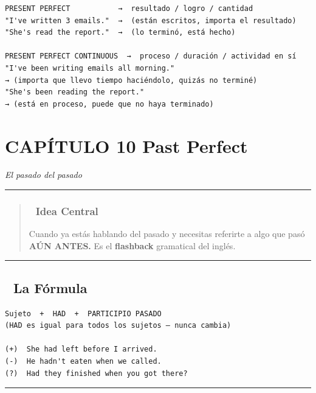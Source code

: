 \documentclass[
  spanish,
  letterpaper,
]{scrbook}
\begin{document}
\begin{verbatim}
PRESENT PERFECT           →  resultado / logro / cantidad
"I've written 3 emails."  →  (están escritos, importa el resultado)
"She's read the report."  →  (lo terminó, está hecho)

PRESENT PERFECT CONTINUOUS  →  proceso / duración / actividad en sí
"I've been writing emails all morning."
→ (importa que llevo tiempo haciéndolo, quizás no terminé)
"She's been reading the report."
→ (está en proceso, puede que no haya terminado)
\end{verbatim}

\chapter{CAPÍTULO 10 Past Perfect}\label{capuxedtulo-10-past-perfect}

\emph{El pasado del pasado}

\begin{center}\rule{0.5\linewidth}{0.5pt}\end{center}

\begin{quote}
\subsection{🎯 Idea Central}\label{idea-central-8}

Cuando ya estás hablando del pasado y necesitas referirte a algo que
pasó \textbf{AÚN ANTES.} Es el \textbf{flashback} gramatical del inglés.
\end{quote}

\begin{center}\rule{0.5\linewidth}{0.5pt}\end{center}

\section{📐 La Fórmula}\label{la-fuxf3rmula-5}

\begin{verbatim}
Sujeto  +  HAD  +  PARTICIPIO PASADO
(HAD es igual para todos los sujetos — nunca cambia)

(+)  She had left before I arrived.
(-)  He hadn't eaten when we called.
(?)  Had they finished when you got there?
\end{verbatim}

\begin{center}\rule{0.5\linewidth}{0.5pt}\end{center}
\end{document}
